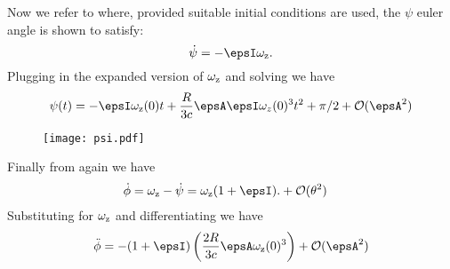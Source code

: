 \documentclass[/home/greg/Thesis/main/main.tex]{subfiles}
\begin{document}
Now we refer to \citet{Landau1969} where, provided suitable initial conditions
are used, the $\psi$ euler angle is shown to satisfy:
\begin{equation}
\dot{\psi} = -\epsI \wz.
\end{equation}
Plugging in the expanded version of $\omega_{\mathrm{z}}$ and solving we have
\begin{equation}
\psi(t) = -\epsI\wz(0) t + \frac{R}{3c} \epsA \epsI \omega_{z}(0)^{3} t^{2} + \pi/2 + \mathcal{O}(\epsA^{2})
\end{equation}

\begin{figure}[htb]
\centering
\texttt{[image: psi.pdf]}
\caption{}
\label{}
\end{figure}

Finally from \citet{Landau1969} again we have
\begin{align}
\dot{\phi} & = \wz - \dot{\psi} = \wz(1 + \epsI). + \mathcal{O}(\theta^{2})
\end{align}
Substituting for $\omega_{\mathrm{z}}$ and differentiating we have
\begin{align}
\ddot{\phi} = -(1+\epsI)\left(\frac{2R}{3c} \epsA \wz(0)^{3}\right) + \mathcal{O}(\epsA^{2})
\end{align}
\end{document}
